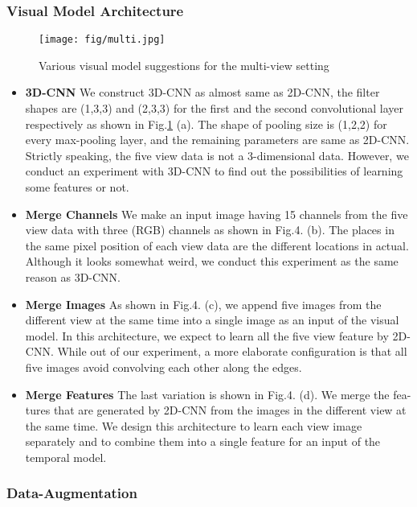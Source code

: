 \subsubsection{Visual Model Architecture}
\begin{figure}[h]
	\centering
	\texttt{[image: fig/multi.jpg]}
	\caption{Various visual model suggestions for the multi-view setting}
	\label{fig:multi}
\end{figure}
\begin{itemize}
	\item \textbf{3D-CNN}
	We construct 3D-CNN as almost same as 2D-CNN, the filter shapes are
	(1,3,3) and (2,3,3) for the first and the second convolutional layer respectively as shown in Fig.\ref{fig:multi} (a). The shape of pooling size is (1,2,2) for every max-pooling layer, and the remaining parameters are same as 2D-CNN. Strictly speaking, the five view data is not a 3-dimensional data. However, we conduct an experiment with 3D-CNN to find out the possibilities of learning some features or not.
	\item \textbf{Merge Channels}
	We make an input image having 15 channels from the five view data with three (RGB) channels as shown in Fig.4. (b). The places in the same pixel position of each view data are the different locations in actual. Although it looks somewhat weird, we conduct this experiment as the same reason as 3D-CNN.
	\item \textbf{Merge Images}
	As shown in Fig.4. (c), we append five images from the different view at the same time into a single image as an input of the visual model. In this architecture, we expect to learn all the five view feature by 2D-CNN. While out of our experiment, a more elaborate configuration is that all five images avoid convolving each other along the edges.
	\item \textbf{Merge Features}
	The last variation is shown in Fig.4. (d). We merge the fea- tures that are generated by 2D-CNN from the images in the different view at the same time. We design this architecture to learn each view image separately and to combine them into a single feature for an input of the temporal model.
\end{itemize}
\subsubsection{Data-Augmentation}



